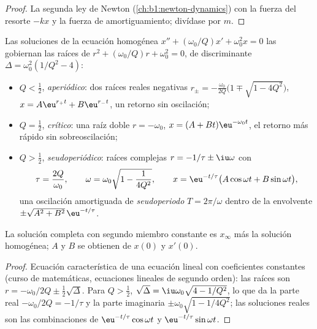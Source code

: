 \begin{proof}
La segunda ley de Newton (\cref{ch:b1:newton-dynamics}) con la fuerza del
resorte $-kx$ y la fuerza de amortiguamiento; divídase por $m$.
\end{proof}

\begin{theorem}\label{thm:b1:transient-regimes:regimes}
Las soluciones de la ecuación homogénea $x'' + (\omega_0/Q)x' +
\omega_0^2 x = 0$ las gobiernan las raíces de $r^2 + (\omega_0/Q)r +
\omega_0^2 = 0$, de discriminante $\Delta = \omega_0^2(1/Q^2 - 4)$:
\begin{itemize}
  \item $Q < \tfrac12$, \emph{aperiódico}: dos raíces reales negativas
        $r_\pm = -\frac{\omega_0}{2Q}\big(1 \mp \sqrt{1 - 4Q^2}\big)$,
        $x = A\eu^{r_+t} + B\eu^{r_-t}$, un retorno sin oscilación;
  \item $Q = \tfrac12$, \emph{crítico}: una raíz doble $r = -\omega_0$,
        $x = (A + Bt)\eu^{-\omega_0 t}$, el retorno más rápido sin
        sobreoscilación;
  \item $Q > \tfrac12$, \emph{seudoperiódico}: raíces complejas
        $r = -1/\tau \pm \iu\omega$ con
        \[
        \tau = \frac{2Q}{\omega_0}, \qquad
        \omega = \omega_0\sqrt{1 - \frac{1}{4Q^2}},
        \qquad
        x = \eu^{-t/\tau}\big(A\cos\omega t + B\sin\omega t\big),
        \]
        una oscilación amortiguada de \emph{seudoperiodo} $T = 2\pi/\omega$
        dentro de la envolvente $\pm\sqrt{A^2 + B^2}\,\eu^{-t/\tau}$.
\end{itemize}
La solución completa con segundo miembro constante es $x_\infty$ más la
solución homogénea; $A$ y $B$ se obtienen de $x(0)$ y $x'(0)$.
\end{theorem}

\begin{proof}
Ecuación característica de una ecuación lineal con coeficientes constantes
(curso de matemáticas, ecuaciones lineales de segundo orden): las raíces
son $r = -\omega_0/2Q \pm \tfrac12\sqrt\Delta$. Para $Q > \tfrac12$,
$\sqrt\Delta = \iu\omega_0\sqrt{4 - 1/Q^2}$, lo que da la parte real
$-\omega_0/2Q = -1/\tau$ y la parte imaginaria $\pm\omega_0\sqrt{1 - 1/4Q^2}$;
las soluciones reales son las combinaciones de $\eu^{-t/\tau}\cos\omega t$
y $\eu^{-t/\tau}\sin\omega t$.
\end{proof}

